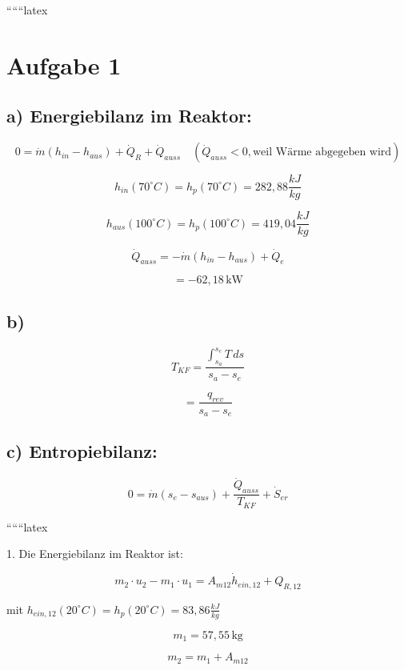 
``````latex

\section*{Aufgabe 1}

\subsection*{a) Energiebilanz im Reaktor:}

\[
0 = \dot{m} \left( h_{in} - h_{aus} \right) + \dot{Q}_R + \dot{Q}_{auss} \quad (\dot{Q}_{auss} < 0, \text{weil Wärme abgegeben wird})
\]

\[
h_{in} (70^\circ C) = h_p (70^\circ C) = 282,88 \frac{kJ}{kg}
\]

\[
h_{aus} (100^\circ C) = h_p (100^\circ C) = 419,04 \frac{kJ}{kg}
\]

\[
\dot{Q}_{auss} = -\dot{m} \left( h_{in} - h_{aus} \right) + \dot{Q}_e
\]

\[
= -62,18 \, \text{kW}
\]

\subsection*{b)}

\[
T_{KF} = \frac{\int_{s_a}^{s_e} T \, ds}{s_a - s_e}
\]

\[
= \frac{q_{rev}}{s_a - s_e}
\]

\subsection*{c) Entropiebilanz:}

\[
0 = \dot{m} \left( s_{e} - s_{aus} \right) + \frac{\dot{Q}_{auss}}{T_{KF}} + \dot{S}_{er}
\]

``````latex


1. Die Energiebilanz im Reaktor ist:

\begin{equation}
m_2 \cdot u_2 - m_1 \cdot u_1 = A_{m12} \dot{h}_{ein,12} + Q_{R,12}
\end{equation}

mit $h_{ein,12} (20^\circ C) = h_p(20^\circ C) = 83,86 \frac{kJ}{kg}$

\begin{equation}
m_1 = 57,55 \, \text{kg}
\end{equation}

\begin{equation}
m_2 = m_1 + A_{m12}
\end{equation}

